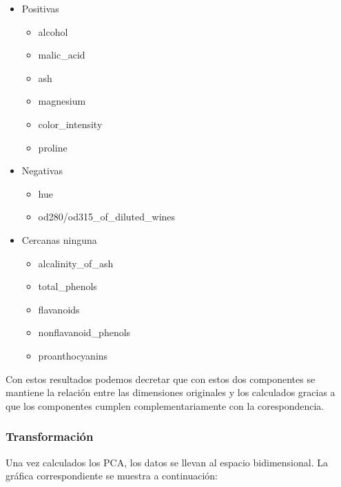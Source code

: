 \begin{itemize}
    \item Positivas
    \begin{itemize}
        \item alcohol
        \item malic\_acid
        \item ash
        \item magnesium
        \item color\_intensity
        \item proline
    \end{itemize}                                                                                                                                                                                                                                                                                                                                                                                                                                                                                                                                                                    
    \item Negativas
    \begin{itemize}
        \item hue
        \item od280/od315\_of\_diluted\_wines
    \end{itemize}
    \item Cercanas ninguna
    \begin{itemize}
        \item alcalinity\_of\_ash
        \item total\_phenols
        \item flavanoids
        \item nonflavanoid\_phenols
        \item proanthocyanins
    \end{itemize}
\end{itemize}
Con estos resultados podemos decretar que con estos dos componentes se mantiene la relación entre las dimensiones originales y los calculados gracias a que los componentes cumplen complementariamente con la corespondencia.

\subsubsection[Transformación]{Transformación}
Una vez calculados los PCA, los datos se llevan al espacio bidimensional. La gráfica correspondiente se muestra a continuación:

